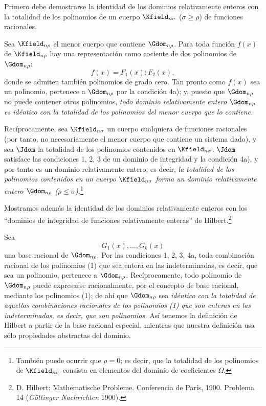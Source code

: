 \documentclass[11pt]{article}
\begin{document}
Primero debe demostrarse la identidad de los dominios relativamente enteros con la totalidad de los polinomios de un cuerpo $\Kfield_{n\sigma}$ ($\sigma\ge\rho$) de funciones racionales.

Sea $\Kfield_{n\rho}$ el menor cuerpo que contiene $\Gdom_{n\rho}$. Para toda función $f(x)$ de $\Kfield_{n\rho}$ hay una representación como cociente de dos polinomios de $\Gdom_{n\rho}$:
\[
  f(x)=F_1(x):F_2(x),
\]
donde se admiten también polinomios de grado cero. Tan pronto como $f(x)$ sea un polinomio, pertenece a $\Gdom_{n\rho}$ por la condición 4a); y, puesto que $\Gdom_{n\rho}$ no puede contener otros polinomios, \emph{todo dominio relativamente entero $\Gdom_{n\rho}$ es idéntico con la totalidad de los polinomios del menor cuerpo que lo contiene.}

Recíprocamente, sea $\Kfield_{n\sigma}$ un cuerpo cualquiera de funciones racionales (por tanto, no necesariamente el menor cuerpo que contiene un sistema dado), y sea $\Jdom$ la totalidad de los polinomios contenidos en $\Kfield_{n\sigma}$. $\Jdom$ satisface las condiciones 1, 2, 3 de un dominio de integridad y la condición 4a), y por tanto es un dominio relativamente entero; es decir, \emph{la totalidad de los polinomios contenidos en un cuerpo $\Kfield_{n\sigma}$ forma un dominio relativamente entero $\Gdom_{n\rho}$ ($\rho\le\sigma$).}\footnote{También puede ocurrir que $\rho=0$; es decir, que la totalidad de los polinomios de $\Kfield_{n\sigma}$ consista en elementos del dominio de coeficientes $\Omega$.}

Mostramos además la identidad de los dominios relativamente enteros con los ``dominios de integridad de funciones relativamente enteras'' de Hilbert.\footnote{D. Hilbert: Mathematische Probleme. Conferencia de París, 1900. Problema 14 (\emph{Göttinger Nachrichten} 1900).}

Sea
\begin{equation}
  G_1(x),\ldots,G_k(x)
\tag{1}
\end{equation}
una base racional de $\Gdom_{n\rho}$. Por las condiciones 1, 2, 3, 4a, toda combinación racional de los polinomios (1) que sea entera en las indeterminadas, es decir, que sea un polinomio, pertenece a $\Gdom_{n\rho}$. Recíprocamente, todo polinomio de $\Gdom_{n\rho}$ puede expresarse racionalmente, por el concepto de base racional, mediante los polinomios (1); de ahí que $\Gdom_{n\rho}$ sea \emph{idéntico con la totalidad de aquellas combinaciones racionales de los polinomios (1) que son enteras en las indeterminadas, es decir, que son polinomios.} Así tenemos la definición de Hilbert a partir de la base racional especial, mientras que nuestra definición usa sólo propiedades abstractas del dominio.
\end{document}
